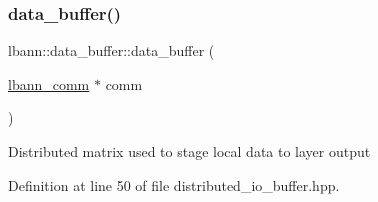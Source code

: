 \subsubsection{\texorpdfstring{data\+\_\+buffer()}{data\_buffer()}\hspace{0.1cm}{\footnotesize\ttfamily [1/2]}}
{\footnotesize\ttfamily lbann\+::data\+\_\+buffer\+::data\+\_\+buffer (\begin{DoxyParamCaption}\item[{\hyperlink{classlbann_1_1lbann__comm}{lbann\+\_\+comm} $\ast$}]{comm }\end{DoxyParamCaption})\hspace{0.3cm}{\ttfamily [inline]}}

Distributed matrix used to stage local data to layer output 

Definition at line 50 of file distributed\+\_\+io\+\_\+buffer.\+hpp.


